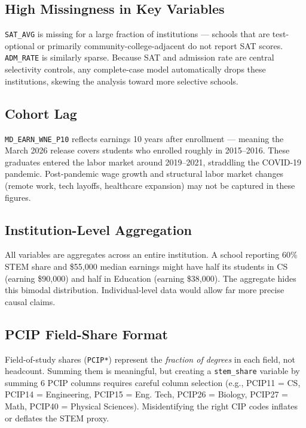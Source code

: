 \documentclass[12pt, letterpaper]{article}
\begin{document}
\subsection{High Missingness in Key Variables}

\texttt{SAT\_AVG} is missing for a large fraction of institutions — schools that are test-optional or primarily community-college-adjacent do not report SAT scores. \texttt{ADM\_RATE} is similarly sparse. Because SAT and admission rate are central selectivity controls, any complete-case model automatically drops these institutions, skewing the analysis toward more selective schools.

\subsection{Cohort Lag}

\texttt{MD\_EARN\_WNE\_P10} reflects earnings 10 years after enrollment — meaning the March 2026 release covers students who enrolled roughly in 2015–2016. These graduates entered the labor market around 2019–2021, straddling the COVID-19 pandemic. Post-pandemic wage growth and structural labor market changes (remote work, tech layoffs, healthcare expansion) may not be captured in these figures.

\subsection{Institution-Level Aggregation}

All variables are aggregates across an entire institution. A school reporting 60\% STEM share and \$55,000 median earnings might have half its students in CS (earning \$90,000) and half in Education (earning \$38,000). The aggregate hides this bimodal distribution. Individual-level data would allow far more precise causal claims.

\subsection{PCIP Field-Share Format}

Field-of-study shares (\texttt{PCIP*}) represent the \textit{fraction of degrees} in each field, not headcount. Summing them is meaningful, but creating a \texttt{stem\_share} variable by summing 6 PCIP columns requires careful column selection (e.g., PCIP11 = CS, PCIP14 = Engineering, PCIP15 = Eng. Tech, PCIP26 = Biology, PCIP27 = Math, PCIP40 = Physical Sciences). Misidentifying the right CIP codes inflates or deflates the STEM proxy.
\end{document}
